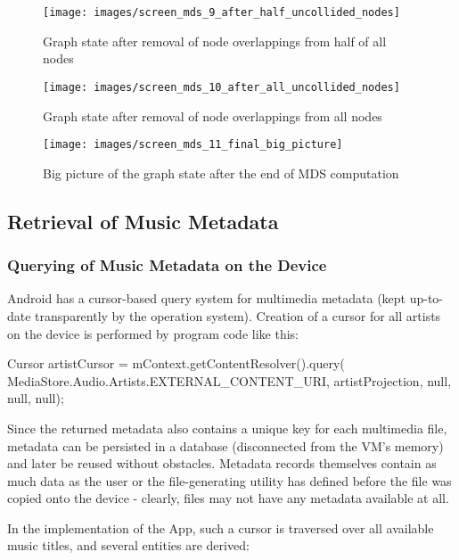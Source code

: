 \begin{figure}[H]
  \centering
    \texttt{[image: images/screen\_mds\_9\_after\_half\_uncollided\_nodes]}
  \caption{Graph state after removal of node overlappings from half of all nodes}
\end{figure}

\begin{figure}[H]
  \centering
    \texttt{[image: images/screen\_mds\_10\_after\_all\_uncollided\_nodes]}
  \caption{Graph state after removal of node overlappings from all nodes}
\end{figure}

\begin{figure}[H]
  \centering
    \texttt{[image: images/screen\_mds\_11\_final\_big\_picture]}
  \caption{Big picture of the graph state after the end of MDS computation}
\end{figure}

\subsection{Retrieval of Music Metadata}

\subsubsection{Querying of Music Metadata on the Device}

Android has a cursor-based query system for multimedia metadata (kept up-to-date transparently by the
operation system). Creation of a cursor for all artists on the device is performed by program code like this:

\begin{code}
Cursor artistCursor = mContext.getContentResolver().query(
	MediaStore.Audio.Artists.EXTERNAL_CONTENT_URI,
    artistProjection, null, null, null);
\end{code}

Since the returned metadata also contains a unique key for each multimedia file, metadata can be
persisted in a database (disconnected from the VM's memory) and later be reused without obstacles.
Metadata records themselves contain as much data as the user or the file-generating utility has defined
before the file was copied onto the device - clearly, files may not have any metadata available at all.

In the implementation of the App, such a cursor is traversed over all available music titles, and several entities are derived:

